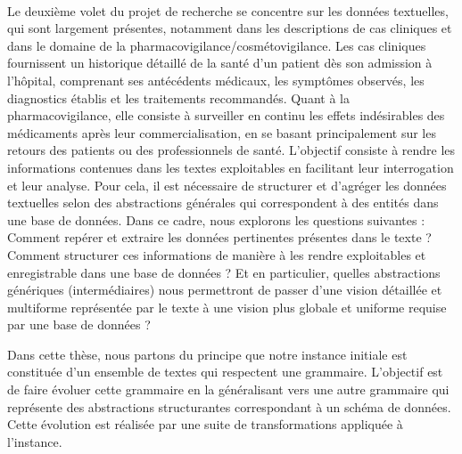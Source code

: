 \begin{example}
\begin{center}
\begin{adjustbox}{max width=\linewidth}
        \end{adjustbox}
    \end{center}
\end{example}

\paragraph{}
Le deuxième volet du projet de recherche se concentre sur les données textuelles, qui sont largement présentes, notamment dans les descriptions de cas cliniques et dans le domaine de la pharmacovigilance/cosmétovigilance.
Les cas cliniques fournissent un historique détaillé de la santé d'un patient dès son admission à l'hôpital, comprenant ses antécédents médicaux, les symptômes observés, les diagnostics établis et les traitements recommandés.
Quant à la pharmacovigilance, elle consiste à surveiller en continu les effets indésirables des médicaments après leur commercialisation, en se basant principalement sur les retours des patients ou des professionnels de santé.
L'objectif consiste à rendre les informations contenues dans les textes exploitables en facilitant leur interrogation et leur analyse.
Pour cela, il est nécessaire de structurer et d'agréger les données textuelles selon des abstractions générales qui correspondent à des entités dans une base de données.
Dans ce cadre, nous explorons les questions suivantes : Comment repérer et extraire les données pertinentes présentes dans le texte ? Comment structurer ces informations de manière à les rendre exploitables et enregistrable dans une base de données ? Et en particulier, quelles abstractions génériques (intermédiaires) nous permettront de passer d'une vision détaillée et multiforme représentée par le texte à une vision plus globale et uniforme requise par une base de données ?

Dans cette thèse, nous partons du principe que notre instance initiale est constituée d'un ensemble de textes qui respectent une grammaire.
L'objectif est de faire évoluer cette grammaire en la généralisant vers une autre grammaire qui représente des abstractions structurantes correspondant à un schéma de données.
Cette évolution est réalisée par une suite de transformations appliquée à l'instance.

